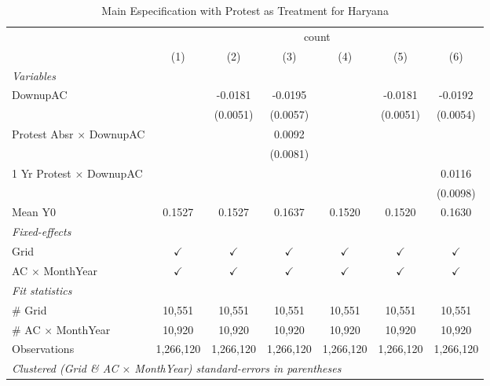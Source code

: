 
\begin{table}[htbp]
   \caption{\label{tab:protest_treat_main_pj} Main Especification with Protest as Treatment for Haryana}
   \centering
   \begin{tabular}{lcccccc}
      \tabularnewline \midrule \midrule
       & \multicolumn{6}{c}{count}\\
                                       & (1)           & (2)           & (3)           & (4)           & (5)           & (6)\\  
      \midrule
      \emph{Variables}\\
      DownupAC                         &               & -0.0181       & -0.0195       &               & -0.0181       & -0.0192\\   
                                       &               & (0.0051)      & (0.0057)      &               & (0.0051)      & (0.0054)\\   
      Protest Absr $\times$ DownupAC   &               &               & 0.0092        &               &               &   \\   
                                       &               &               & (0.0081)      &               &               &   \\   
      1 Yr Protest $\times$ DownupAC   &               &               &               &               &               & 0.0116\\   
                                       &               &               &               &               &               & (0.0098)\\   
      Mean Y0                          & 0.1527        & 0.1527        & 0.1637        & 0.1520        & 0.1520        & 0.1630\\  
      \midrule
      \emph{Fixed-effects}\\
      Grid                             & $\checkmark$  & $\checkmark$  & $\checkmark$  & $\checkmark$  & $\checkmark$  & $\checkmark$\\   
      AC $\times$ MonthYear            & $\checkmark$  & $\checkmark$  & $\checkmark$  & $\checkmark$  & $\checkmark$  & $\checkmark$\\   
      \midrule
      \emph{Fit statistics}\\
      \# Grid                          & 10,551        & 10,551        & 10,551        & 10,551        & 10,551        & 10,551\\  
      \# AC $\times$ MonthYear         & 10,920        & 10,920        & 10,920        & 10,920        & 10,920        & 10,920\\  
      Observations                     & 1,266,120     & 1,266,120     & 1,266,120     & 1,266,120     & 1,266,120     & 1,266,120\\  
      \midrule \midrule
      \multicolumn{7}{l}{\emph{Clustered (Grid \& AC $\times$ MonthYear) standard-errors in parentheses}}\\
   \end{tabular}
\end{table}


